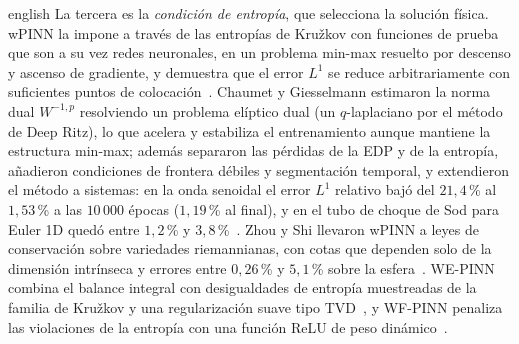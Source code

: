 \documentclass[0000.tex]{subfiles}
\begin{document}
\begin{hyphenrules}{english}
La tercera es la \emph{condición de entropía}, que selecciona la solución física. wPINN la impone a través de las entropías de Kružkov con funciones de prueba que son a su vez redes neuronales, en un problema min-max resuelto por descenso y ascenso de gradiente, y demuestra que el error $L^1$ se reduce arbitrariamente con suficientes puntos de colocación~\cite{de2024wpinns}. Chaumet y Giesselmann estimaron la norma dual $W^{-1,p}$ resolviendo un problema elíptico dual (un $q$-laplaciano por el método de Deep Ritz), lo que acelera y estabiliza el entrenamiento aunque mantiene la estructura min-max; además separaron las pérdidas de la EDP y de la entropía, añadieron condiciones de frontera débiles y segmentación temporal, y extendieron el método a sistemas: en la onda senoidal el error $L^1$ relativo bajó del $21{,}4$\,\% al $1{,}53$\,\% a las $10\,000$ épocas ($1{,}19$\,\% al final), y en el tubo de choque de Sod para Euler 1D quedó entre $1{,}2$\,\% y $3{,}8$\,\%~\cite{chaumet2024improving}. Zhou y Shi llevaron wPINN a leyes de conservación sobre variedades riemannianas, con cotas que dependen solo de la dimensión intrínseca y errores entre $0{,}26$\,\% y $5{,}1$\,\% sobre la esfera~\cite{zhou2025weak}. WE-PINN combina el balance integral con desigualdades de entropía muestreadas de la familia de Kružkov y una regularización suave tipo TVD~\cite{oubarka2026weak}, y WF-PINN penaliza las violaciones de la entropía con una función ReLU de peso dinámico~\cite{wang2025wf}.


\end{hyphenrules}
\end{document}
